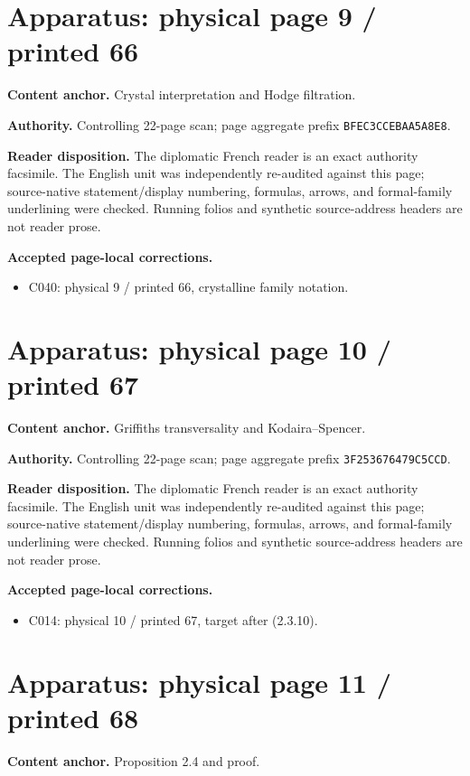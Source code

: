 \documentclass[10pt]{article}
\begin{document}
\section*{Apparatus: physical page 9 / printed 66}
\textbf{Content anchor.} Crystal interpretation and Hodge filtration.

\textbf{Authority.} Controlling 22-page scan; page aggregate prefix \texttt{BFEC3CCEBAA5A8E8}.

\textbf{Reader disposition.} The diplomatic French reader is an exact authority facsimile. The English unit was independently re-audited against this page; source-native statement/display numbering, formulas, arrows, and formal-family underlining were checked. Running folios and synthetic source-address headers are not reader prose.

\textbf{Accepted page-local corrections.} \begin{itemize}
\item C040: physical 9 / printed 66, crystalline family notation.
\end{itemize}
\newpage
\setcounter{footnote}{0}
\fontsize{10.2pt}{12.04pt}\selectfont
\section*{Apparatus: physical page 10 / printed 67}
\textbf{Content anchor.} Griffiths transversality and Kodaira--Spencer.

\textbf{Authority.} Controlling 22-page scan; page aggregate prefix \texttt{3F253676479C5CCD}.

\textbf{Reader disposition.} The diplomatic French reader is an exact authority facsimile. The English unit was independently re-audited against this page; source-native statement/display numbering, formulas, arrows, and formal-family underlining were checked. Running folios and synthetic source-address headers are not reader prose.

\textbf{Accepted page-local corrections.} \begin{itemize}
\item C014: physical 10 / printed 67, target after (2.3.10).
\end{itemize}
\newpage
\setcounter{footnote}{0}
\fontsize{10.2pt}{12.04pt}\selectfont
\section*{Apparatus: physical page 11 / printed 68}
\textbf{Content anchor.} Proposition 2.4 and proof.
\end{document}
